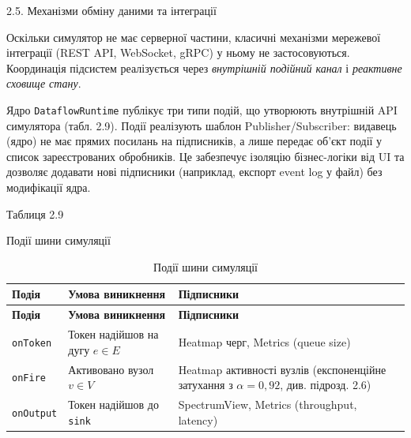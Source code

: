 \documentclass[
]{article}
\newcommand{\passthrough}[1]{#1}
\begin{document}
\protect{}\label{Xcd238668ad118f5c941097fa2a256159b3b67a3}{}2.5.
Механізми обміну даними та інтеграції

Оскільки симулятор не має серверної частини, класичні механізми
мережевої інтеграції (REST API, WebSocket, gRPC) у ньому не
застосовуються. Координація підсистем реалізується через
\emph{внутрішній подійний канал} і \emph{реактивне сховище стану}.

Ядро \passthrough{\lstinline!DataflowRuntime!} публікує три типи подій,
що утворюють внутрішній API симулятора (табл. 2.9). Події реалізують
шаблон Publisher/Subscriber: видавець (ядро) не має прямих посилань на
підписників, а лише передає об'єкт події у список зареєстрованих
обробників. Це забезпечує ізоляцію бізнес-логіки від UI та дозволяє
додавати нові підписники (наприклад, експорт event log у файл) без
модифікації ядра.

Таблиця 2.9

Події шини симуляції

\begin{longtable}[]{@{}
  >{\raggedright\arraybackslash}p{}
  >{\raggedright\arraybackslash}p{}
  >{\raggedright\arraybackslash}p{}@{}}
\caption[Події шини симуляції]{Події шини симуляції}\tabularnewline
\toprule\noalign{}
\begin{minipage}[b]{\linewidth}\raggedright
\textbf{Подія}
\end{minipage} & \begin{minipage}[b]{\linewidth}\raggedright
\textbf{Умова виникнення}
\end{minipage} & \begin{minipage}[b]{\linewidth}\raggedright
\textbf{Підписники}
\end{minipage} \\
\midrule\noalign{}
\endfirsthead
\toprule\noalign{}
\begin{minipage}[b]{\linewidth}\raggedright
\textbf{Подія}
\end{minipage} & \begin{minipage}[b]{\linewidth}\raggedright
\textbf{Умова виникнення}
\end{minipage} & \begin{minipage}[b]{\linewidth}\raggedright
\textbf{Підписники}
\end{minipage} \\
\midrule\noalign{}
\endhead
\bottomrule\noalign{}
\endlastfoot
\passthrough{\lstinline!onToken!} & Токен надійшов на дугу \(e \in E\) &
Heatmap черг, Metrics (queue size) \\
\passthrough{\lstinline!onFire!} & Активовано вузол \(v \in V\) &
Heatmap активності вузлів (експоненційне затухання з \(\alpha = 0,92\),
див. підрозд. 2.6) \\
\passthrough{\lstinline!onOutput!} & Токен надійшов до
\passthrough{\lstinline!sink!} & SpectrumView, Metrics (throughput,
latency) \\
\end{longtable}
\end{document}
